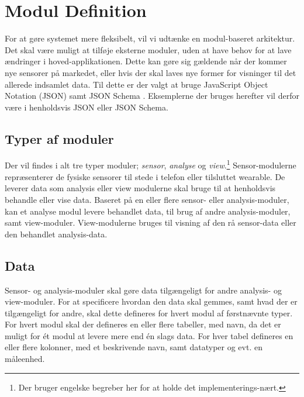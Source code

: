 \section{Modul Definition}


For at gøre systemet mere fleksibelt, vil vi udtænke en modul-baseret arkitektur.
Det skal være muligt at tilføje eksterne moduler, uden at have behov for at lave ændringer i hoved-applikationen.
Dette kan gøre sig gældende når der kommer nye sensorer på markedet, eller hvis der skal laves nye former for visninger til det allerede indsamlet data.
Til dette er der valgt at bruge JavaScript Object Notation (JSON) samt JSON Schema \cite{json_schema}.
Eksemplerne der bruges herefter vil derfor være i henholdsvis JSON eller JSON Schema.

\subsection{Typer af moduler}
Der vil findes i alt tre typer moduler; \textit{sensor}, \textit{analyse} og \textit{view}.\footnote{Der bruger engelske begreber her for at holde det implementerings-nært.}
Sensor-modulerne repræsenterer de fysiske sensorer til stede i telefon eller tilsluttet wearable.
De leverer data som analysis eller view modulerne skal bruge til at henholdsvis behandle eller vise data.
Baseret på en eller flere sensor- eller analysis-moduler, kan et analyse modul levere behandlet data, til brug af andre analysis-moduler, samt view-moduler.
View-modulerne bruges til visning af den rå sensor-data eller den behandlet analysis-data.

\subsection{Data}
Sensor- og analysis-moduler skal gøre data tilgængeligt for andre analysis- og view-moduler.
For at specificere hvordan den data skal gemmes, samt hvad der er tilgængeligt for andre, skal dette defineres for hvert modul af førstnævnte typer.
For hvert modul skal der defineres en eller flere tabeller, med navn, da det er muligt for ét modul at levere mere end én slags data.
For hver tabel defineres en eller flere kolonner, med et beskrivende navn, samt datatyper og evt. en måleenhed.

